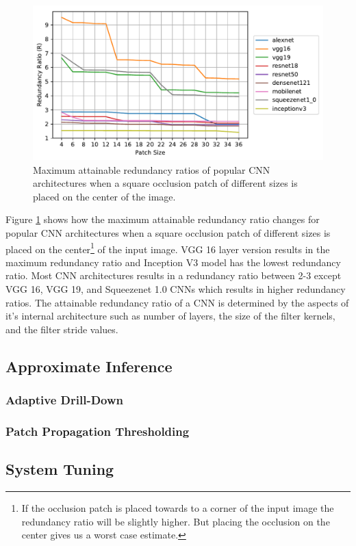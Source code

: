 \begin{figure}[t]
\includegraphics[width=\columnwidth]{images/redundancy_ratio}
\caption{Maximum attainable redundancy ratios of popular CNN architectures when a square occlusion patch of different sizes is placed on the center of the image.}
\label{fig:redundancy_ratio}
\end{figure}

Figure \ref{fig:redundancy_ratio} shows how the maximum attainable redundancy ratio changes for popular CNN architectures when a square occlusion patch of different sizes is placed on the center\footnote{If the occlusion patch is placed towards to a corner of the input image the redundancy ratio will be slightly higher. But placing the occlusion on the center gives us a worst case estimate.} of the input image. VGG 16 layer version results in the maximum redundancy ratio and Inception V3 model has the lowest redundancy ratio. Most CNN architectures results in a redundancy ratio between 2-3 except VGG 16, VGG 19, and Squeezenet 1.0 CNNs which results in higher redundancy ratios. The attainable redundancy ratio of a CNN is determined by the aspects of it's internal architecture such as number of layers, the size of the filter kernels, and the filter stride values.

\subsection{Approximate Inference}

\subsubsection{Adaptive Drill-Down}

\subsubsection{Patch Propagation Thresholding}

\subsection{System Tuning}

